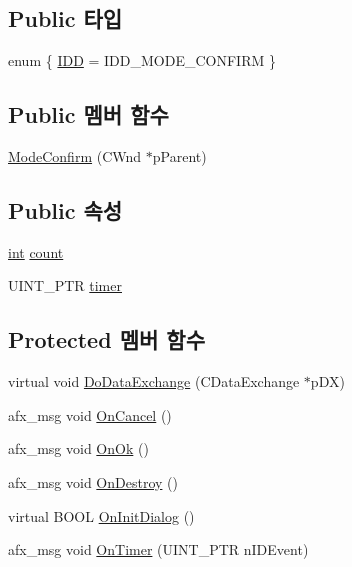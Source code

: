 \subsection*{Public 타입}
\begin{DoxyCompactItemize}
\item 
enum \{ \mbox{\hyperlink{class_mode_confirm_a8e439d67303e9c4b5eabe35621f0b130a24889350f357e37d8f7359dfdf7b5ae5}{I\+DD}} = I\+D\+D\+\_\+\+M\+O\+D\+E\+\_\+\+C\+O\+N\+F\+I\+RM
 \}
\end{DoxyCompactItemize}
\subsection*{Public 멤버 함수}
\begin{DoxyCompactItemize}
\item 
\mbox{\hyperlink{class_mode_confirm_ae1f0d757ed04ed5e6f5455a94bff868d}{Mode\+Confirm}} (C\+Wnd $\ast$p\+Parent)
\end{DoxyCompactItemize}
\subsection*{Public 속성}
\begin{DoxyCompactItemize}
\item 
\mbox{\hyperlink{_util_8cpp_a0ef32aa8672df19503a49fab2d0c8071}{int}} \mbox{\hyperlink{class_mode_confirm_a5084929261ffab2d070714ba905395d3}{count}}
\item 
U\+I\+N\+T\+\_\+\+P\+TR \mbox{\hyperlink{class_mode_confirm_a14129767fe1e52b1779e533b3dc3953d}{timer}}
\end{DoxyCompactItemize}
\subsection*{Protected 멤버 함수}
\begin{DoxyCompactItemize}
\item 
virtual void \mbox{\hyperlink{class_mode_confirm_a7bdff1de3b87c2d066fabf0fcb4e5211}{Do\+Data\+Exchange}} (C\+Data\+Exchange $\ast$p\+DX)
\item 
afx\+\_\+msg void \mbox{\hyperlink{class_mode_confirm_a5933e4703c9d0af9747384a61f994804}{On\+Cancel}} ()
\item 
afx\+\_\+msg void \mbox{\hyperlink{class_mode_confirm_a96cb9297efcd1f637efa870a21561f51}{On\+Ok}} ()
\item 
afx\+\_\+msg void \mbox{\hyperlink{class_mode_confirm_a74d3691e5fe1cbe376f082a431de8c43}{On\+Destroy}} ()
\item 
virtual B\+O\+OL \mbox{\hyperlink{class_mode_confirm_a9ff77c7ebd8b567013ca1ef1dee00b46}{On\+Init\+Dialog}} ()
\item 
afx\+\_\+msg void \mbox{\hyperlink{class_mode_confirm_a403c1ae22f1d3791ed51a452185a64be}{On\+Timer}} (U\+I\+N\+T\+\_\+\+P\+TR n\+I\+D\+Event)
\end{DoxyCompactItemize}


